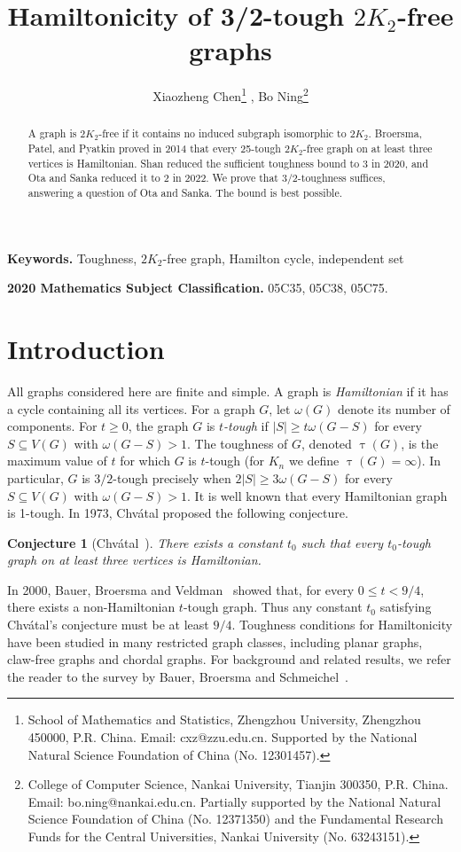 \documentclass[11pt]{article}
\title{Hamiltonicity of 3/2-tough $2K_2$-free graphs}
\author{
Xiaozheng Chen\footnote{School of Mathematics and Statistics, Zhengzhou University, Zhengzhou 450000, P.R. China. Email: cxz@zzu.edu.cn. Supported by the National Natural Science Foundation of China (No. 12301457).}
, Bo Ning\footnote{College of Computer Science, Nankai University, Tianjin 300350, P.R. China. Email: bo.ning@nankai.edu.cn. Partially supported by the National Natural Science Foundation of China (No. 12371350) and the Fundamental Research Funds for the Central Universities, Nankai University (No. 63243151).}}
\date{}
\numberwithin{equation}{section}
\newtheorem{conj}[theorem]{Conjecture}
\theoremstyle{plain}
\theoremstyle{definition}
\theoremstyle{plain}
\begin{document}
\maketitle

\begin{abstract}
A graph is $2K_2$-free if it contains no induced subgraph isomorphic to
$2K_2$. Broersma, Patel, and Pyatkin proved in 2014 that every
25-tough $2K_2$-free graph on at least three vertices is Hamiltonian.
Shan reduced the sufficient toughness bound to $3$ in 2020, and
Ota and Sanka reduced it to $2$ in 2022. We prove that
$3/2$-toughness suffices, answering a question of Ota and Sanka.
The bound is best possible.
\end{abstract}

\medskip
\noindent\textbf{Keywords.} Toughness, $2K_2$-free graph, Hamilton cycle, independent set

\medskip
\noindent\textbf{2020 Mathematics Subject Classification.} 05C35, 05C38, 05C75.


\section{Introduction}\label{sec:introduction}

All graphs considered here are finite and simple. A graph is
\emph{Hamiltonian} if it has a cycle containing all its vertices.
For a graph $G$, let $\omega(G)$ denote its number of components.
For $t\geq0$, the graph $G$ is \emph{$t$-tough} if
$|S|\geq t\omega(G-S)$ for every $S\subseteq V(G)$ with
$\omega(G-S)>1$. 
The toughness of $G$, denoted $\uptau(G)$, 
is the maximum value of $t$ for which $G$ is $t$-tough
(for $K_n$ we define $\uptau(G)=\infty$).
In particular,
$G$ is $3/2$-tough precisely when $2|S|\geq3\omega(G-S)$
for every $S\subseteq V(G)$ with $\omega(G-S)>1$.
 It is well known that every Hamiltonian graph is 1-tough. 
In 1973, Chv\'atal \cite{Chvatal1973} proposed the following conjecture.

\begin{conj}[Chv\'atal~\cite{Chvatal1973}]\label{conj:Chvatal}
    There exists a constant $t_0$ such that every $t_0$-tough graph on at least three vertices is Hamiltonian.
\end{conj}

In 2000, Bauer, Broersma and Veldman~\cite{BauerBroersmaVeldman2000} showed
that, for every $0\leq t<9/4$, there exists a non-Hamiltonian
$t$-tough graph. Thus any constant $t_0$ satisfying Chv\'atal's
conjecture must be at least $9/4$.
Toughness conditions for Hamiltonicity have been studied in many
restricted graph classes, including planar graphs, claw-free graphs
and chordal graphs. For background and related results, we refer
the reader to the survey by Bauer, Broersma and
Schmeichel~\cite{BauerBroersmaSchmeichel2006}.
\end{document}
